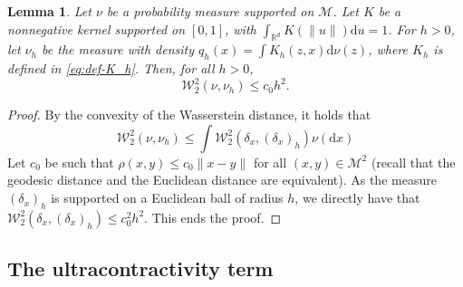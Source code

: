 \documentclass[10pt,a4paper]{article}
\newcommand{\R}{{\mathbb R}}
\newcommand\cM{\mathcal{M}}
\newcommand\W{\mathcal{W}}
\newcommand\dd{\mathrm{d}}
\newtheorem{lemma}[theorem]{Lemma}
\begin{document}
\begin{lemma}\label{lem:convolution_wass}
    Let $\nu$ be a probability measure supported on $\cM$. Let $K$ be a nonnegative kernel supported on $[0,1]$, with $\int_{\R^d}K(\|u\|)\dd u=1$. For $h>0$, let $\nu_h$ be the measure with density $q_h(x) = \int K_h(z,x)\dd \nu(z)$, where $K_h$ is defined in \eqref{eq:def-K_h}. 
   {Then, for all $h>0$,
        \begin{equation}
        \W_2^2(\nu,\nu_h)\le  c_0 h^2.
    \end{equation}}
\end{lemma}
\begin{proof}
    By the convexity of the Wasserstein distance, it holds that
    \begin{equation}
        \W_2^2(\nu,\nu_h)\le \int \W_2^2(\delta_x,(\delta_x)_h)\nu(\dd  x)
    \end{equation}
    Let $c_0$ be such that $\rho(x,y)\le c_0\|x-y\|$ for all $(x,y)\in \cM^2$ (recall that the geodesic distance and the Euclidean distance are equivalent). 
   {As the measure $(\delta_x)_h$ is supported on a Euclidean ball of radius $h$, we directly have that $\W_2^2(\delta_x,(\delta_x)_h) \le c_0^2 h^2$. This ends the proof.}
\end{proof}

\subsection{The ultracontractivity term}\label{sec:ultracontracticity}
\end{document}
